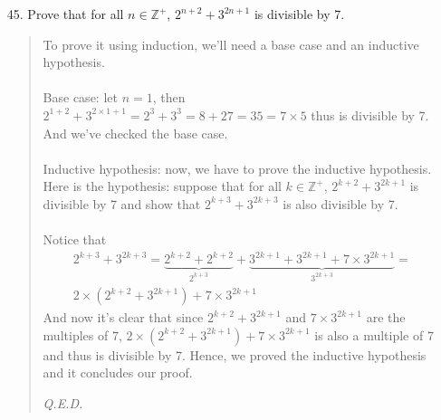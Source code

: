 \documentclass[12pt, a4paper]{article}                      %
\newcommand{\intzp}{\mathbb{Z^+}}
\begin{document}
\begin{itemize}
\item[45.]
Prove that for all $n \in \intzp$, $2^{n + 2} + 3^{2n + 1}$ is divisible by 7.
\begin{quote}
To prove it using induction, we'll need a base case and an inductive hypothesis.\\\\
Base case: let $n = 1$, then $2^{1 + 2} + 3^{2 \times 1 + 1} = 2^3 + 3^3 = 8 + 27 = 35 = 7 \times 5$ thus is divisible
by 7. And we've checked the base case.\\\\
Inductive hypothesis: now, we have to prove the inductive hypothesis. Here is the hypothesis:
suppose that for all $k \in \intzp$, $2^{k + 2} + 3^{2k + 1}$ is divisible by 7 and show that
$2^{k + 3} + 3^{2k + 3}$ is also divisible by 7.\\\\
Notice that
\begin{align*}
2^{k + 3} + 3^{2k + 3} = \underbrace{2^{k + 2} + 2^{k + 2}}_{2^{k + 3}} + \underbrace{3^{2k + 1} + 3^{2k + 1} + 7 \times 3^{2k + 1}}_{3^{2k + 3}} =\\
2 \times (2^{k + 2} + 3 ^ {2k + 1}) + 7 \times 3^{2k + 1}
\end{align*}
And now it's clear that since $2^{k + 2} + 3 ^ {2k + 1}$ and $7 \times 3^{2k + 1}$ are the multiples of 7,
$2 \times (2^{k + 2} + 3 ^ {2k + 1}) + 7 \times 3^{2k + 1}$ is also a multiple of 7 and thus is divisible by 7.
Hence, we proved the inductive hypothesis and it concludes our proof.
\begin{flushright}
\textit{Q.E.D.}
\end{flushright}
\end{quote}

\item[]


\end{itemize}
\end{document}
